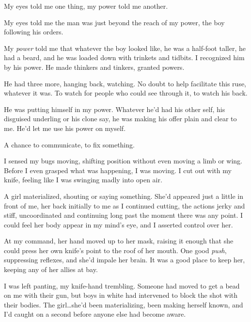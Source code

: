 My eyes told me one thing, my power told me another.



My eyes told me the man was just beyond the reach of my power, the boy following his orders.



My \emph{power} told me that whatever the boy looked like, he was a half-foot taller, he had a beard, and he was loaded down with trinkets and tidbits.  I recognized him by his power.  He made thinkers and tinkers, granted powers.



He had three more, hanging back, watching.  No doubt to help facilitate this ruse, whatever it was.  To watch for people who could see through it, to watch his back.



He was putting himself in my power.  Whatever he'd had his other self, his disguised underling or his clone say, he was making his offer plain and clear to me.  He'd let me use his power on myself.



A chance to communicate, to fix something.



I sensed my bugs moving, shifting position without even moving a limb or wing.  Before I even grasped what was happening, I was moving.  I cut out with my knife, feeling like I was swinging madly into open air.



A girl materialized, shouting or saying something.  She'd appeared just a little in front of me, her back initially to me as I continued cutting, the actions jerky and stiff, uncoordinated and continuing long past the moment there was any point.  I could feel her body appear in my mind's eye, and I asserted control over her.



At my command, her hand moved up to her mask, raising it enough that she could press her own knife's point to the roof of her mouth.  One good \emph{push}, suppressing reflexes, and she'd impale her brain.  It was a good place to keep her, keeping any of her allies at bay.



I was left panting, my knife-hand trembling.  Someone had moved to get a bead on me with their gun, but boys in white had intervened to block the shot with their bodies.  The girl\ldots she'd been materializing, been making herself known, and I'd caught on a second before anyone else had become aware.



